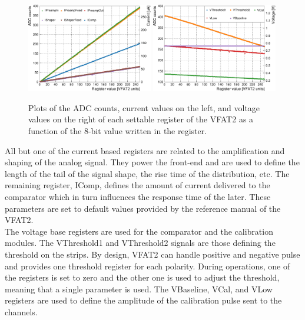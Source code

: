       \begin{figure}[h!]
        \centering
        \includegraphics[width=0.49\textwidth]{img/plots/cADC_Current-crop}
        \includegraphics[width=0.49\textwidth]{img/plots/cADC_Voltage-crop}
        \caption{Plots of the ADC counts, current values on the left, and voltage values on the right of each settable register of the VFAT2 as a function of the 8-bit value written in the register.}
        \label{fig:II-5-qualification-adc}
      \end{figure}

      All but one of the current based registers are related to the amplification and shaping of the analog signal. They power the front-end and are used to define the length of the tail of the signal shape, the rise time of the distribution, etc. The remaining register, IComp, defines the amount of current delivered to the comparator which in turn influences the response time of the later. These parameters are set to default values provided by the reference manual of the VFAT2. \\

      The voltage base registers are used for the comparator and the calibration modules. The VThreshold1 and VThreshold2 signals are those defining the threshold on the strips. By design, VFAT2 can handle positive and negative pulse and provides one threshold register for each polarity. During operations, one of the registers is set to zero and the other one is used to adjust the threshold, meaning that a single parameter is used. The VBaseline, VCal, and VLow registers are used to define the amplitude of the calibration pulse sent to the channels.  

